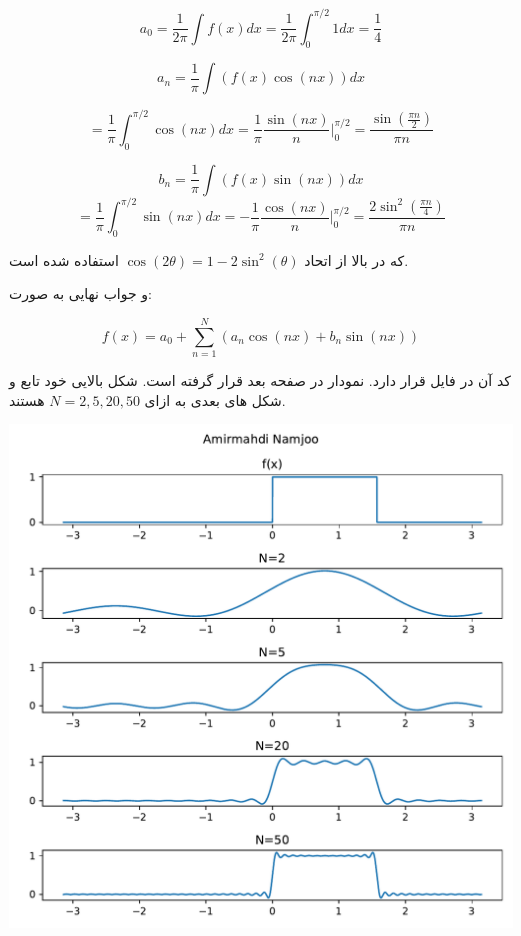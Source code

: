 \documentclass[12pt]{article}
\begin{document}
$$a_0 = \frac{1}{2\pi} \int f(x) dx = \frac{1}{2\pi} \int_{0}^{\pi/2} 1 dx = \boxed{ \frac{1}{4}}$$


$$a_n = \frac{1}{\pi} \int (f(x) \cos (nx)) dx$$

$$=\frac{1}{\pi}\int_{0}^{\pi/2} \cos (nx) dx = \frac{1}{\pi }\frac{\sin(nx)}{n}|_{0}^{\pi/2}  = \boxed{\frac{\sin \left(\frac{\pi  n}{2}\right)}{\pi  n}}$$

$$b_n = \frac{1}{\pi} \int (f(x) \sin (nx)) dx$$
$$= \frac{1}{\pi} \int_{0}^{\pi/2} \sin (nx) dx = - \frac{1}{\pi} \frac{\cos (n x)}{n} |_{0}^{\pi/2}  = \boxed{\frac{2 \sin ^2\left(\frac{\pi  n}{4}\right)}{\pi  n}}$$

که در بالا از اتحاد
$\cos(2 \theta) = 1 - 2\sin^2 (\theta)$
استفاده شده است.


و جواب نهایی به صورت:

$$f(x) = a_0 + \sum_{n=1}^{N} (a_n \cos (n x) + b_n \sin (n x))$$



کد آن در فایل 
قرار دارد. نمودار در صفحه بعد قرار گرفته است. شکل بالایی خود تابع و شکل های بعدی به ازای $N=2,5,20,50$ هستند.

\begin{center}
	\includegraphics[width = 1.0 \textwidth]{images/2.pdf}
\end{center}
\end{document}
